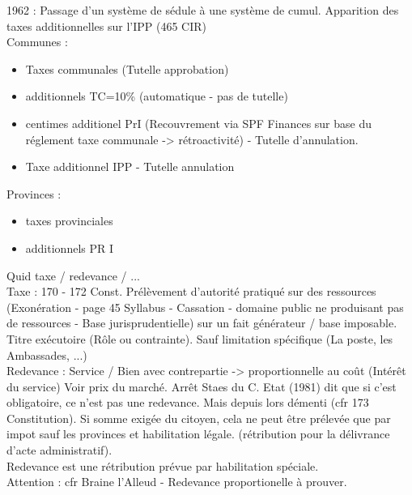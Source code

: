 \documentclass{book}
\begin{document}
1962 : Passage d'un système de sédule à une système de cumul. Apparition des taxes additionnelles sur l'IPP (465 CIR)\\

Communes :\\

\begin{itemize}
\item Taxes communales (Tutelle approbation)
\item additionnels TC=10\% (automatique - pas de tutelle)
\item centimes additionel PrI (Recouvrement via SPF Finances sur base du réglement taxe communale -> rétroactivité) - Tutelle d'annulation.
\item Taxe additionnel IPP - Tutelle annulation
\end{itemize}

\null 

Provinces :\\

\begin{itemize}
\item taxes provinciales
\item additionnels PR I
\end{itemize}

\null

Quid taxe / redevance / ... \\

Taxe : 170 - 172 Const. Prélèvement d'autorité pratiqué sur des ressources (Exonération - page 45 Syllabus - Cassation - domaine public ne produisant pas de ressources - Base jurisprudentielle) sur un fait générateur / base imposable. Titre exécutoire (Rôle ou contrainte). Sauf limitation spécifique (La poste, les Ambassades, ...)\\

Redevance : Service / Bien avec contrepartie -> proportionnelle au coût (Intérêt du service) Voir prix du marché. Arrêt Staes du C. Etat (1981) dit que si c'est obligatoire, ce n'est pas une redevance. Mais depuis lors  démenti (cfr 173 Constitution). Si somme exigée du citoyen, cela ne peut être prélevée que par impot sauf les provinces et habilitation légale. (rétribution pour la délivrance d'acte administratif).\\

Redevance est une rétribution prévue par habilitation spéciale.\\

Attention : cfr Braine l'Alleud - Redevance proportionelle à prouver.\\
\end{document}
